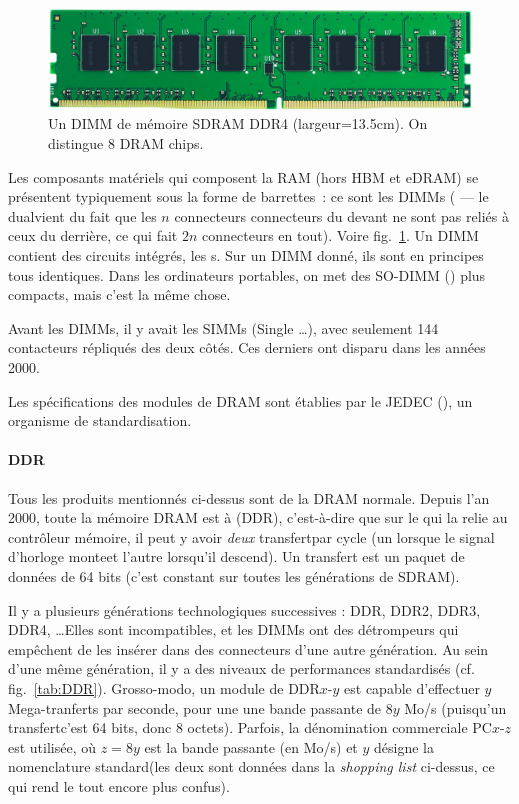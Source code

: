 \begin{figure}
  \centering
  \includegraphics[width=13.5cm]{DIMM.jpg}
  \caption{Un DIMM de mémoire SDRAM DDR4 (largeur=13.5cm). On distingue 8 DRAM chips.\label{fig:DIMM}}
\end{figure}

Les composants matériels qui composent la RAM (hors HBM et eDRAM) se présentent
typiquement sous la forme de \og barrettes\fg~: ce sont les DIMMs ( --- le \og dual\fg vient du fait que les $n$
connecteurs connecteurs du devant ne sont pas reliés à ceux du derrière, ce qui
fait $2n$ connecteurs en tout). Voire fig.~\ref{fig:DIMM}. Un DIMM contient des
circuits intégrés, les s. Sur un DIMM donné, ils sont en
principes tous identiques. Dans les ordinateurs portables, on met des SO-DIMM
() plus compacts, mais c'est la même chose.

\begin{danger}
  Avant les DIMMs, il y avait les SIMMs (Single \dots), avec seulement 144
  contacteurs répliqués des deux côtés. Ces derniers ont disparu dans les années
  2000.
\end{danger}

Les spécifications des modules de DRAM sont établies par le JEDEC
(), un organisme de
standardisation.



\paragraph{DDR} Tous les produits mentionnés ci-dessus sont de la DRAM \og
normale\fg. Depuis l'an 2000, toute la mémoire DRAM est à \og {}\fg (DDR), c'est-à-dire que sur le  qui la relie au
contrôleur mémoire, il peut y avoir \emph{deux} \og transfert\fg par cycle (un
lorsque le signal d'horloge \og monte\fg et l'autre lorsqu'il \og
descend\fg). Un transfert est un paquet de données de 64 bits (c'est constant
sur toutes les générations de SDRAM).

Il y a plusieurs générations technologiques successives : DDR, DDR2, DDR3, DDR4,
\dots Elles sont incompatibles, et les DIMMs ont des détrompeurs qui empêchent
de les insérer dans des connecteurs d'une autre génération. Au sein d'une même
génération, il y a des niveaux de performances standardisés
(cf. fig.~\ref{tab:DDR}). Grosso-modo, un module de DDR$x$-$y$ est capable
d'effectuer $y$ Mega-tranferts par seconde, pour une une bande passante de $8y$
Mo/s (puisqu'un \og transfert\fg c'est 64 bits, donc 8 octets). Parfois, la
dénomination commerciale PC$x$-$z$ est utilisée, où $z=8y$ est la bande passante
(en Mo/s) et $y$ désigne la nomenclature \og standard\fg (les deux sont données
dans la \emph{shopping list} ci-dessus, ce qui rend le tout encore plus confus).

